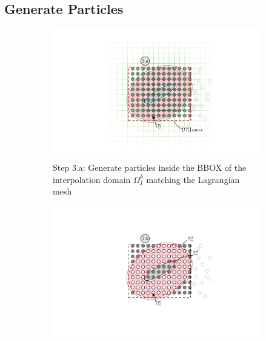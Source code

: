
	
	\subsection{Generate Particles}
	
		\begin{figure}[p]
	     \centering
	     \begin{subfigure}[t]{0.55\textwidth}
			\includegraphics[trim=8.05cm 2.85cm 5.4cm 3.05cm, clip, width=0.9\linewidth]{./figures/coupling/generateParticles/generateParticles_part1.pdf}
			\caption{Step 3.a: Generate particles inside the BBOX of the interpolation domain $\Omega_{I}^k$ matching the Lagrangian mesh}
			\label{fig:generateParticles_part1}
		 \end{subfigure}%
		 \quad %
	     \begin{subfigure}[t]{0.55\textwidth}
			\includegraphics[trim=8.05cm 2.85cm 5.4cm 3.05cm, clip, width=0.9\linewidth]{./figures/coupling/generateParticles/generateParticles_part2.pdf}

\end{subfigure}
\end{figure}
